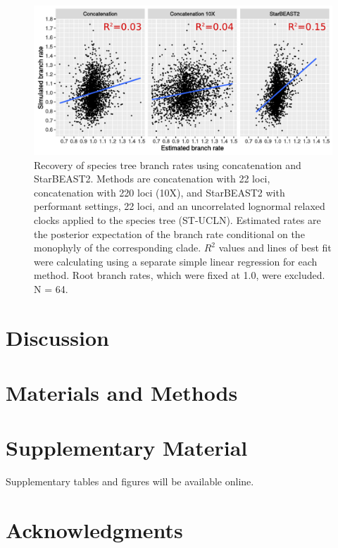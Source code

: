 \documentclass[12pt]{article}
\begin{document}
\begin{figure}[htb!]
\centering
\includegraphics[width=16cm]{branch_rates.pdf}
\caption
{Recovery of species tree branch rates using concatenation and StarBEAST2.
Methods are concatenation with 22 loci, concatenation with 220 loci (10X), and
StarBEAST2 with performant settings, 22 loci, and an uncorrelated lognormal
relaxed clocks applied to the species tree (ST-UCLN). Estimated rates are the
posterior expectation of the branch rate conditional on the monophyly of the
corresponding clade. $R^2$ values and lines of best fit were calculating using a separate
simple linear regression for each method. Root branch rates, which were fixed at
1.0, were excluded. N = 64.}
\label{fig:branchRatesLM}
\end{figure}

\section{Discussion}


\section{Materials and Methods}


\section{Supplementary Material}

Supplementary tables and figures will be available online.

\section{Acknowledgments}
\end{document}
